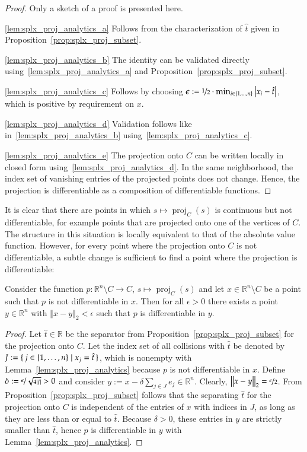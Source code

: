\documentclass[twoside,11pt]{article}
\DeclareMathOperator{\proj}{proj}
\newcommand{\R}{\mathbb{R}}
\newcommand{\0}{\mathcal{O}}
\newcommand{\norm}[1]{\left\Vert#1\right\Vert}
\newcommand{\abs}[1]{\left\vert #1 \right\vert}
\newcommand{\discint}[2]{\{#1,\dotsc,#2\}}
\newcommand{\inint}[2]{\in\discint{#1}{#2}}
\begin{document}
\begin{proof}
Only a sketch of a proof is presented here.

\ref{lem:splx_proj_analytics_a}
Follows from the characterization of $\hat{t}$ given in Proposition~\ref{prop:splx_proj_subset}.

\ref{lem:splx_proj_analytics_b}
The identity can be validated directly using~\ref{lem:splx_proj_analytics_a} and Proposition~\ref{prop:splx_proj_subset}.

\ref{lem:splx_proj_analytics_c}
Follows by choosing $\epsilon := \nicefrac{1}{2}\cdot\min_{i\inint{1}{n}}\abs{x_i - \hat{t}}$, which is positive by requirement on $x$.

\ref{lem:splx_proj_analytics_d}
Validation follows like in~\ref{lem:splx_proj_analytics_b} using~\ref{lem:splx_proj_analytics_c}.

\ref{lem:splx_proj_analytics_e}
The projection onto $C$ can be written locally in closed form using~\ref{lem:splx_proj_analytics_d}.
In the same neighborhood, the index set of vanishing entries of the projected points does not change.
Hence, the projection is differentiable as a composition of differentiable functions.
\end{proof}
It is clear that there are points in which $s\mapsto\proj_C(s)$ is continuous but not differentiable, for example points that are projected onto one of the vertices of $C$.
The structure in this situation is locally equivalent to that of the absolute value function.
However, for every point where the projection onto $C$ is not differentiable, a subtle change is sufficient to find a point where the projection is differentiable:
\begin{lemma}
\label{lem:splx_proj_critical}
Consider the function $p\colon\R^n\setminus C\to C$, $s\mapsto\proj_C(s)$ and let $x\in\R^n\setminus C$ be a point such that $p$ is not differentiable in $x$.
Then for all $\epsilon > 0$ there exists a point $y\in\R^n$ with $\norm{x - y}_2 < \epsilon$ such that $p$ is differentiable in $y$.
\end{lemma}
\begin{proof}
Let $\hat{t}\in\R$ be the separator from Proposition~\ref{prop:splx_proj_subset} for the projection onto $C$.
Let the index set of all collisions with $\hat{t}$ be denoted by $J := \set{j\inint{1}{n} | x_j = \hat{t}}$, which is nonempty with Lemma~\ref{lem:splx_proj_analytics} because $p$ is not differentiable in $x$.
Define $\delta := \nicefrac{\epsilon}{\sqrt{4\abs{J}}} > 0$ and consider $y := x - \delta\sum_{j\in J}e_j\in\R^n$.
Clearly, $\norm{x - y}_2 = \nicefrac{\epsilon}{2}$.
From Proposition~\ref{prop:splx_proj_subset} follows that the separating $\hat{t}$ for the projection onto $C$ is independent of the entries of $x$ with indices in $J$, as long as they are less than or equal to $\hat{t}$.
Because $\delta > 0$, these entries in $y$ are strictly smaller than $\hat{t}$, hence $p$ is differentiable in $y$ with Lemma~\ref{lem:splx_proj_analytics}.
\end{proof}
\end{document}
